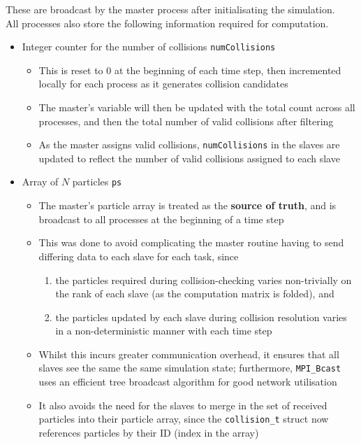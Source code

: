 \documentclass[12pt]{article}
\begin{document}
These are broadcast by the master process after initialisating the simulation.\\

All processes also store the following information required for computation.
\begin{itemize}
    \item Integer counter for the number of collisions \texttt{numCollisions}
    \begin{itemize}
        \item This is reset to 0 at the beginning of each time step, then incremented locally for each process as it generates collision candidates
        \item The master's variable will then be updated with the total count across all processes, and then the total number of valid collisions after filtering
        \item As the master assigns valid collisions, \texttt{numCollisions} in the slaves are updated to reflect the number of valid collisions assigned to each slave
    \end{itemize}
    \item Array of $N$ particles \texttt{ps}
    \begin{itemize}
        \item The master's particle array is treated as the \textbf{source of truth}, and is broadcast to all processes at the beginning of a time step
        \item This was done to avoid complicating the master routine having to send differing data to each slave for each task, since
        \begin{enumerate}[label=(\arabic*)]
            \item the particles required during collision-checking varies non-trivially on the rank of each slave (as the computation matrix is folded), and
            \item the particles updated by each slave during collision resolution varies in a non-deterministic manner with each time step
        \end{enumerate}
        \item Whilst this incurs greater communication overhead, it ensures that all slaves see the same the same simulation state; furthermore, \texttt{MPI\_Bcast} uses an efficient tree broadcast algorithm for good network utilisation
        \item It also avoids the need for the slaves to merge in the set of received particles into their particle array, since the \texttt{collision\_t} struct now references particles by their ID (index in the array)

\end{itemize}
\end{itemize}
\end{document}
